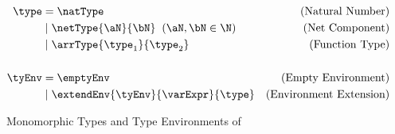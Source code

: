 \begin{figure}[ht]
\begin{align*}
    \type &= \natType
              & (\text{Natural Number}) \\
          &\mid \netType{\aN}{\bN}\;\;(\aN,\bN \in \N)
              & (\text{Net Component}) \\
          &\mid \arrType{\type_1}{\type_2}
              & (\text{Function Type}) \\
    \\
    \tyEnv &= \emptyEnv
              & (\text{Empty Environment}) \\
           &\mid \extendEnv{\tyEnv}{\varExpr}{\type}
              & (\text{Environment Extension})
\end{align*}
\caption{Monomorphic Types and Type Environments of \DSL{}}
\label{fig:mono-types}
\end{figure}

